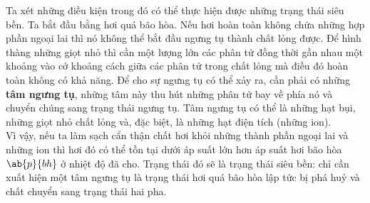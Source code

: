Ta xét những điều kiện trong đó có thể thực hiện được những trạng thái siêu bền. Ta bắt đầu bằng hơi quá bão hòa. Nếu hơi hoàn toàn không chứa những hợp phần ngoại lai thì nó không thể bắt đầu ngưng tụ thành chất lỏng được. Để hình thàng những giọt nhỏ thì cần một lượng lớn các phân tử đồng thời gần nhau một khoảng vào cớ khoảng cách giữa các phân tử trong chất lỏng mà điều đó hoàn toàn không có khả năng. Để cho sự ngưng tụ có thể xảy ra, cần phải có những \textbf{tâm ngưng tụ}, những tâm này thu hút những phân tử bay về phía nó và chuyển chúng sang trạng thái ngưng tụ. Tâm ngưng tụ có thể là những hạt bụi, những giọt nhỏ chất lỏng và, đặc biệt, là những hạt điện tích (những ion).\\

Vì vậy, nếu ta làm sạch cẩn thận chất hơi khỏi những thành phần ngoại lai và những ion thì hơi đó có thể tồn tại dưới áp suất lớn hơn áp suất hơi bão hòa $\ab{p}{bh}$ ở nhiệt độ đã cho. Trạng thái đó sẽ là trạng thái siêu bền: chỉ cần xuất hiện một tâm ngưng tụ là trạng thái hơi quá bão hòa lập tức bị phá huỷ và chất chuyển sang trạng thái hai pha.

